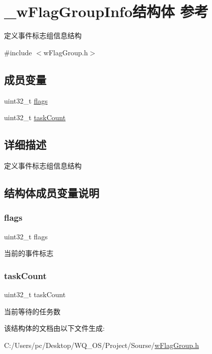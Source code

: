 \hypertarget{struct__w_flag_group_info}{}\section{\+\_\+w\+Flag\+Group\+Info结构体 参考}
\label{struct__w_flag_group_info}


定义事件标志组信息结构  




{\ttfamily \#include $<$w\+Flag\+Group.\+h$>$}

\subsection*{成员变量}
\begin{DoxyCompactItemize}
\item 
uint32\+\_\+t \mbox{\hyperlink{struct__w_flag_group_info_a773b39d480759f67926cb18ae2219281}{flags}}
\item 
uint32\+\_\+t \mbox{\hyperlink{struct__w_flag_group_info_a80462c64b9184115aa568f08227f7f4a}{task\+Count}}
\end{DoxyCompactItemize}


\subsection{详细描述}
定义事件标志组信息结构 

\subsection{结构体成员变量说明}
\mbox{\label{struct__w_flag_group_info_a773b39d480759f67926cb18ae2219281}} 
\subsubsection{\texorpdfstring{flags}{flags}}
{\footnotesize\ttfamily uint32\+\_\+t flags}

当前的事件标志 \mbox{\label{struct__w_flag_group_info_a80462c64b9184115aa568f08227f7f4a}} 
\subsubsection{\texorpdfstring{task\+Count}{taskCount}}
{\footnotesize\ttfamily uint32\+\_\+t task\+Count}

当前等待的任务数 

该结构体的文档由以下文件生成\+:\begin{DoxyCompactItemize}
\item 
C\+:/\+Users/pc/\+Desktop/\+W\+Q\+\_\+\+O\+S/\+Project/\+Sourse/\mbox{\hyperlink{w_flag_group_8h}{w\+Flag\+Group.\+h}}\end{DoxyCompactItemize}
